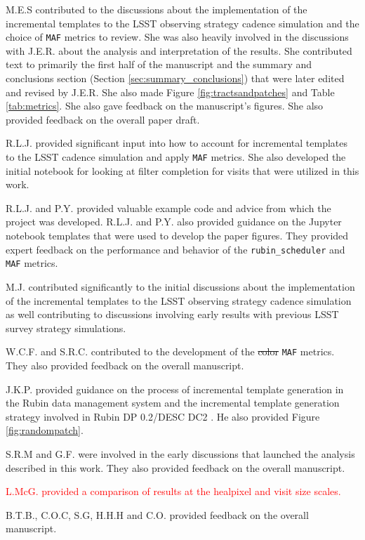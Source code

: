 \documentclass[preprintm,linenumbers]{aastex631}
\newcommand{\rubinscheduler}{\texttt{rubin\_scheduler}\xspace}
\newcommand{\maf}{\texttt{MAF}\xspace}
\providecommand{\red}[1]{\textcolor{red}{#1}}
\begin{document}
M.E.S contributed to the discussions about the implementation of the incremental templates to the LSST observing strategy cadence simulation and the choice of \maf metrics to review.  She was also heavily involved in the discussions with J.E.R. about the analysis and interpretation of the results. She contributed text to primarily the first half of the manuscript and the summary and conclusions section (Section \ref{sec:summary_conclusions}) that were later edited and revised by J.E.R. She also made Figure \ref{fig:tractsandpatches} and Table \ref{tab:metrics}. She also gave feedback on the manuscript's figures. She also provided feedback on the overall paper draft. 

R.L.J. provided significant input into how to account for incremental templates to the LSST cadence simulation and apply \texttt{MAF} metrics. She also developed the initial notebook for looking at filter completion for visits that were utilized in this work. 

R.L.J. and P.Y. provided valuable example code and advice from which the project was developed. R.L.J. and P.Y. also provided guidance on the Jupyter notebook templates that were used to develop the paper figures. They provided expert feedback on the performance and behavior of the \rubinscheduler and \maf metrics.

M.J. contributed significantly to the initial discussions about the implementation of the incremental templates to the LSST observing strategy cadence simulation as well contributing to discussions involving early results with previous LSST survey strategy simulations. 

W.C.F. and S.R.C. contributed to the development of the \sout{color} \maf metrics. They also provided feedback on the overall manuscript. 

J.K.P. provided guidance on the process of incremental template generation in the Rubin data management system and the incremental template generation strategy involved in Rubin DP 0.2/DESC DC2 . He also provided Figure \ref{fig:randompatch}.

S.R.M and G.F. were involved in the early discussions that launched the analysis described in this work. They also provided feedback on the overall manuscript. 

\red{L.McG. provided a comparison of results at the healpixel and visit size scales.}

B.T.B., C.O.C, S.G, H.H.H and C.O. provided feedback on the overall manuscript. 
\end{document}
